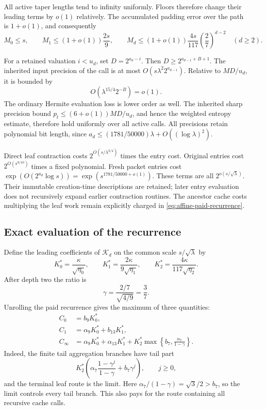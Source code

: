 All active taper lengths tend to infinity uniformly. Floors therefore
change their leading terms by $o(1)$ relatively. The accumulated padding
error over the path is $1+o(1)$, and consequently
\begin{equation}
 M_0\le s,\qquad
 M_1\le(1+o(1))\frac{2s}{9},\qquad
 M_d\le(1+o(1))\frac{4s}{117}
                   \left(\frac27\right)^{d-2}\quad(d\ge2).
 \label{eq:affine-wire-masses}
\end{equation}

For a retained valuation $i<u_d$, set $D=2^{a_d-i}$. Then
$D\ge2^{a_{d-1}+B+1}$. The inherited input precision of the call is at
most $O(s\lambda^2 2^{a_{d-1}})$. Relative to $MD/u_d$, it is bounded by
\[
 O\!\left(\lambda^{15/4}2^{-B}\right)=o(1).
\]
The ordinary Hermite evaluation loss is lower order as well. The inherited
sharp precision bound $p_t\le(6+o(1))MD/u_d$, and hence the weighted
entropy estimate, therefore hold uniformly over all active calls.
All precisions retain polynomial bit length, since
$a_d\le(1781/50000)\lambda+O((\log\lambda)^2)$.

Direct leaf contraction costs $2^{O(s/\lambda^{3/4})}$ times the entry
cost. Original entries cost $2^{O(s^{9/10})}$ times a fixed polynomial.
Fresh packet entries cost
$\exp(O(2^{a_d}\log s))=\exp(s^{1781/50000+o(1)})$.
These terms are all $2^{o(s/\sqrt\lambda)}$. Their immutable
creation-time descriptions are retained; later entry evaluation does not
recursively expand earlier contraction routines. The ancestor cache costs
multiplying the leaf work remain explicitly charged in
\eqref{eq:affine-paid-recurrence}.

\subsection{Exact evaluation of the recurrence}

Define the leading coefficients of $\mathcal K_d$ on the common scale
$s/\sqrt\lambda$ by
\[
 K_0^*=\frac{\kappa}{\sqrt{\eta_0}},\qquad
 K_1^*=\frac{2\kappa}{9\sqrt{\eta_1}},\qquad
 K_2^*=\frac{4\kappa}{117\sqrt{\eta_2}}.
\]
After depth two the ratio is
\[
 \gamma=\frac{2/7}{\sqrt{4/9}}=\frac37.
\]
Unrolling the paid recurrence gives the maximum of three quantities:
\begin{align*}
 C_0&=b_9K_0^*,\\
 C_1&=\alpha_9K_0^*+b_{13}K_1^*,\\
 C_\infty&=\alpha_9K_0^*+\alpha_{13}K_1^*
              +K_2^*\max\left\{b_7,
                                  \frac{\alpha_7}{1-\gamma}\right\}.
\end{align*}
Indeed, the finite tail aggregation branches have tail part
\[
 K_2^*\left(\alpha_7\frac{1-\gamma^j}{1-\gamma}
                 +b_7\gamma^j\right),\qquad j\ge0,
\]
and the terminal leaf route is the limit. Here
$\alpha_7/(1-\gamma)=\sqrt3/2>b_7$, so the limit controls every tail
branch. This also pays for the route containing all recursive cache calls.

